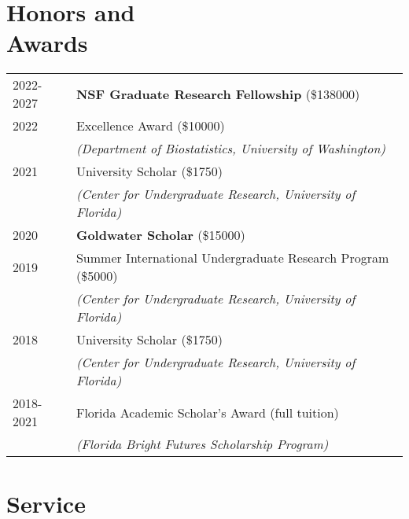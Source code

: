 \documentclass[margin,centered]{res}
\begin{document}
\begin{resume}




\section{\sc Honors and\\ Awards}

\begin{tabular}{@{}p{0.8in}p{4in}}
2022-2027 & \textbf{NSF Graduate Research Fellowship} (\$138000)\\
2022 & Excellence Award (\$10000)\\
&\textit{(Department of Biostatistics, University of Washington)}\\
2021 & University Scholar (\$1750)\\
&\textit{(Center for Undergraduate Research, University of Florida)}\\
2020 & \textbf{Goldwater Scholar} (\$15000)\\
2019 & Summer International Undergraduate Research Program (\$5000) \\
&\textit{(Center for Undergraduate Research, University of Florida)}\\
2018 & University Scholar (\$1750)\\
&\textit{(Center for Undergraduate Research, University of Florida)}\\
2018-2021 & Florida Academic Scholar's Award (full tuition) \\
&\textit{(Florida Bright Futures Scholarship Program)}\\
\end{tabular}

\section{\sc Service}


\end{resume}
\end{document}
